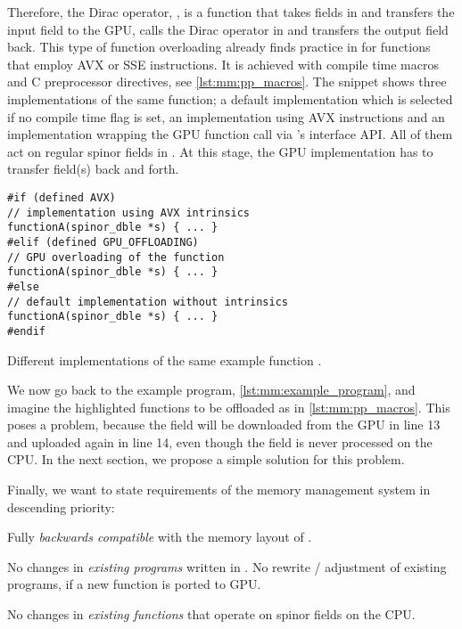 Therefore, the Dirac operator, , is a function that takes fields in \openqxd and transfers the input field to the GPU, calls the Dirac operator in \quda and transfers the output field back.
This type of function overloading already finds practice in \openqxd for functions that employ AVX or SSE instructions.
It is achieved with compile time macros and C preprocessor directives, see \cref{lst:mm:pp_macros}.
The snippet shows three implementations of the same function; a default implementation which is selected if no compile time flag is set, an implementation using AVX instructions and an implementation wrapping the GPU function call via \quda's interface API.
All of them act on regular spinor fields in \openqxd.
At this stage, the GPU implementation has to transfer field(s) back and forth.

\begin{codelisting}
\begin{verbatim}
#if (defined AVX)
// implementation using AVX intrinsics
functionA(spinor_dble *s) { ... }
#elif (defined GPU_OFFLOADING)
// GPU overloading of the function
functionA(spinor_dble *s) { ... }
#else
// default implementation without intrinsics
functionA(spinor_dble *s) { ... }
#endif
\end{verbatim}
\caption{Different implementations of the same example function .}
\label{lst:mm:pp_macros}
\end{codelisting}

We now go back to the example program, \cref{lst:mm:example_program}, and imagine the highlighted functions to be offloaded as in \cref{lst:mm:pp_macros}.
This poses a problem, because the field  will be downloaded from the GPU in line 13 and uploaded again in line 14, even though the field is never processed on the CPU.
In the next section, we propose a simple solution for this problem.

Finally, we want to state requirements of the memory management system in descending priority:
\begin{requirements}
  \item \label{mm:req:R1} Fully \emph{backwards compatible} with the memory layout of \openqxd.
  \item \label{mm:req:R2} No changes in \emph{existing programs} written in \openqxd. No rewrite / adjustment of existing programs, if a new function is ported to GPU.
  \item \label{mm:req:R3} No changes in \emph{existing functions} that operate on spinor fields on the CPU.
\end{requirements}

